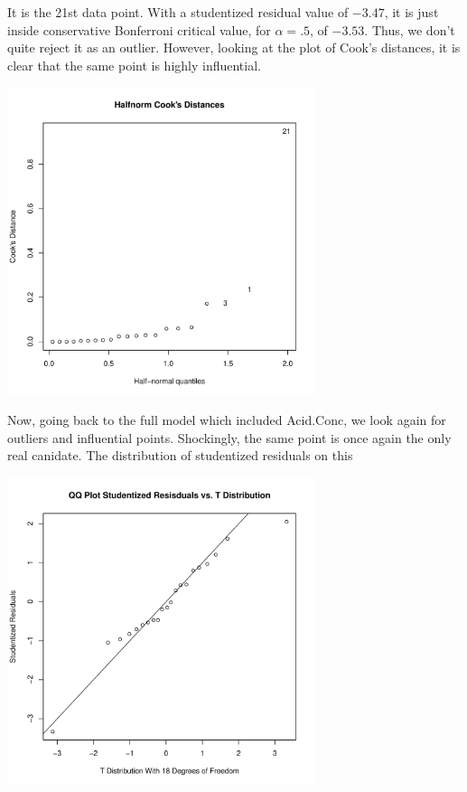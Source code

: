 \documentclass[11pt]{article}
\theoremstyle{definition}
\begin{document}
\begin{itemize}
\begin{center}
        \end{center}
        It is the 21st data point. With a studentized residual value of $-3.47$, it is just inside conservative Bonferroni critical value, for $\alpha=.5$, of $-3.53$. Thus, we don't quite reject it as an outlier. However, looking at the plot of Cook's distances, it is clear that the same point is highly influential.
        \begin{center}
            \includegraphics[width=9cm]{hw8/hw8_4_small_cook}
        \end{center}
        Now, going back to the full model which included Acid.Conc, we look again for outliers and influential points. Shockingly, the same point is once again the only real canidate. The distribution of studentized residuals on this
        \begin{center}
            \includegraphics[width=9cm]{hw8/hw8_4_rstudent} 

\end{center}
\end{itemize}
\end{document}
